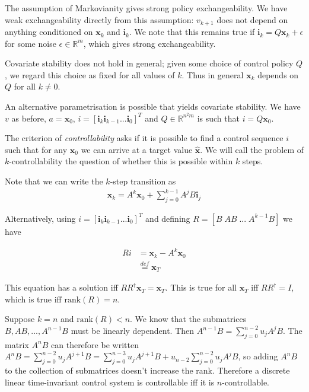 The assumption of Markovianity gives strong policy exchangeability. We have weak exchangeability directly from this assumption: $v_{k+1}$ does not depend on anything conditioned on $\mathbf{x}_k$ and $\mathbf{i}_k$. We note that this remains true if $\mathbf{i}_k = Q\mathbf{x}_k + \epsilon$ for some noise $\epsilon \in \mathbb{R}^m$, which gives strong exchangeability.

Covariate stability does not hold in general; given some choice of control policy $Q$, we regard this choice as fixed for all values of $k$. Thus in general $\mathbf{x}_k$ depends on $Q$ for all $k\neq 0$.

An alternative parametrisation is possible that yields covariate stability. We have $v$ as before, $a=\mathbf{x}_0$, $i=[\mathbf{i}_k \mathbf{i}_{k-1} ... \mathbf{i}_0]^T$ and $Q\in \mathbb{R}^{n^2m}$ is such that $i = Q \mathbf{x}_0$.

The criterion of \emph{controllability} asks if it is possible to find a control sequence $i$ such that for any $\mathbf{x}_0$ we can arrive at a target value $\hat{\mathbf{x}}$. We will call the problem of $k$-controllability the question of whether this is possible within $k$ steps.

Note that we can write the $k$-step transition as
\begin{align}
    \mathbf{x}_k = A^k \mathbf{x}_0 + \sum_{j=0}^{k-1} A^j B \mathbf{i}_j
\end{align}

Alternatively, using $i=[\mathbf{i}_k \mathbf{i}_{k-1} ... \mathbf{i}_0]^T$ and defining $R=[B\;AB\; ...\;A^{k-1}B]$ we have

\begin{align}
    Ri &= \mathbf{x}_k - A^k \mathbf{x}_0 \\
       &\overset{def}{=} \mathbf{x}_T
\end{align}

This equation has a solution iff $RR^\dagger \mathbf{x}_T = \mathbf{x}_T$. This is true for all $\mathbf{x}_T$ iff $RR^\dagger = I$, which is true iff $\text{rank}(R)=n$.

Suppose $k=n$ and $\text{rank}(R) < n$. We know that the submatrices $B, AB, ...,A^{n-1}B$ must be linearly dependent. Then $A^{n-1}B = \sum_{j=0}^{n-2} u_j A^j B$. The matrix $A^n B$ can therefore be written $A^n B = \sum_{j=0}^{n-2} u_j A^{j+1} B= \sum_{j=0}^{n-3} u_j A^{j+1} B + u_{n-2} \sum_{j=0}^{n-2} u_j A^j B$, so adding $A^n B$ to the collection of submatrices doesn't increase the rank. Therefore a discrete linear time-invariant control system is controllable iff it is $n$-controllable.

